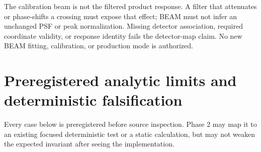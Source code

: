 \documentclass[11pt]{article}
\begin{document}
The calibration beam is not the filtered product response.  A filter that
attenuates or phase-shifts a crossing must expose that effect; BEAM must not
infer an unchanged PSF or peak normalization.  Missing detector association,
required coordinate validity, or response identity fails the detector-map
claim.  No new BEAM fitting, calibration, or production mode is authorized.

\section{Preregistered analytic limits and deterministic falsification}

Every case below is preregistered before source inspection.  Phase 2 may map
it to an existing focused deterministic test or a static calculation, but may
not weaken the expected invariant after seeing the implementation.
\end{document}
